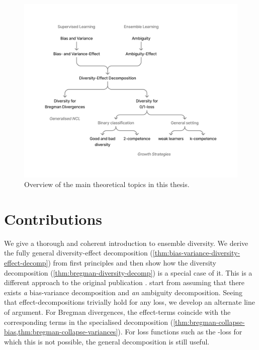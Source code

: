 \documentclass[
	twoside=false, %
]{kaobook}
\begin{document}
\begin{figure}[hb!]
  \includegraphics[width=\textwidth]{figma-illustrations/thesis-overview.pdf}
  \caption{Overview of the main theoretical topics in this thesis.}
  \label{fig:overview}
\end{figure}

\section{Contributions}
\label{sec:contributions}

We give a thorough and coherent introduction to ensemble diversity. We derive the fully general diversity-{effect} decomposition (\cf \ref{thm:bias-variance-diversity-effect-decomp}) from first principles and then show how the diversity decomposition (\cf \ref{thm:bregman-diversity-decomp}) is a special case of it. This is a different approach to the original publication \cite{wood_UnifiedTheoryDiversity_2023}. \citeauthor{wood_UnifiedTheoryDiversity_2023} start from assuming that there exists \textit{a} bias-variance decomposition and \textit{an} ambiguity decomposition.
Seeing that effect-decompositions trivially hold for any loss, we develop an alternate line of argument.
For Bregman divergences, the effect-terms coincide with the corresponding terms in the specialised decomposition (\cf \cref{thm:bregman-collapse-bias,thm:bregman-collapse-variances}). For loss functions such as the \zeroone-loss for which this is not possible, the general decomposition is still useful.
\end{document}
